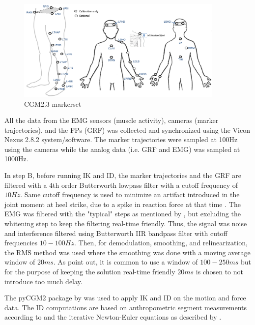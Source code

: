 \documentclass[../main.tex]{subfiles}
\begin{document}
\begin{figure}
    \centering
    \includegraphics[width=0.9\textwidth]{img/CGM23_markerset2.png}
    \caption{CGM2.3 markerset}
    \label{fig:cgm23-markerset}
\end{figure}

All the data from the \ac{EMG} sensors (muscle activity), cameras (marker trajectories), and the \acp{FP} (\ac{GRF}) was collected and synchronized using the Vicon Nexus 2.8.2 system/software.
The marker trajectories were sampled at 100Hz using the cameras while the analog data (i.e. \ac{GRF} and \ac{EMG}) was sampled at 1000Hz.

In step B, before running \ac{IK} and \ac{ID}, the marker trajectories and the \ac{GRF} are filtered with a 4th order Butterworth lowpass filter with a cutoff frequency of $10Hz$. 
Same cutoff frequency is used to minimize an artifact introduced in the joint moment at heel strike, due to a spike in reaction force at that time \cite{Kristianslund2012}.
The \ac{EMG} was filtered with the "typical" steps as mentioned by \citeauthor{Clancy2016} \parencite[99]{Clancy2016}, but excluding the whitening step to keep the filtering real-time friendly.
Thus, the signal was noise and interference filtered using Butterworth IIR bandpass filter with cutoff frequencies $10-100Hz$. 
Then, for demodulation, smoothing, and relinearization, the RMS method was used where the smoothing was done with a moving average window of $20ms$. 
As \citeauthor{Clancy2016} point out, it is common to use a window of $100-250 ms$ but for the purpose of keeping the solution real-time friendly $20ms$ is chosen to not introduce too much delay.

The pyCGM2 package by \textcite{Leboeuf2019} was used to apply \ac{IK} and \ac{ID} on the motion and force data.
The \ac{ID} computations are based on anthropometric segment measurements according to \textcite{Dempster1955} and the iterative Newton-Euler equations as described by \textcite{Dumas2004}.
\end{document}
